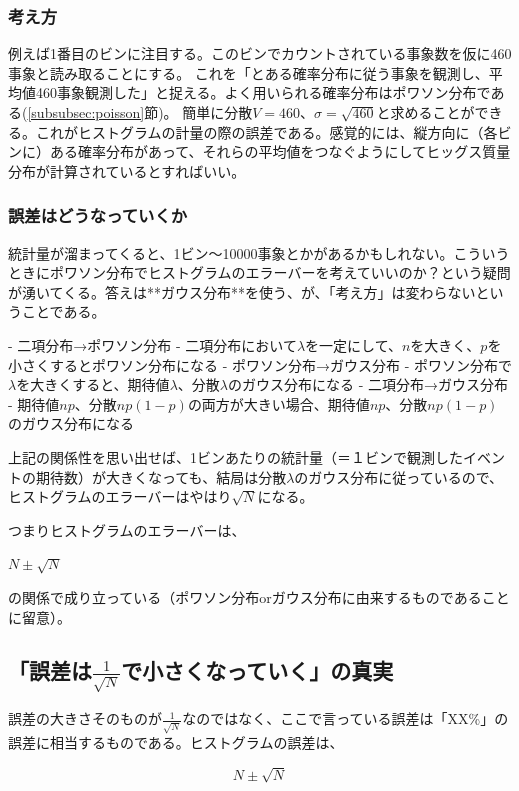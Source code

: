 \documentclass[a4paper,uplatex]{jsreport}
\begin{document}
\subsubsection{考え方}
例えば1番目のビンに注目する。このビンでカウントされている事象数を仮に460事象と読み取ることにする。
これを「とある確率分布に従う事象を観測し、平均値460事象観測した」と捉える。よく用いられる確率分布はポワソン分布である(\ref{subsubsec:poisson}節)。
簡単に分散$V=460$、$\sigma=\sqrt{460}$と求めることができる。これがヒストグラムの計量の際の誤差である。感覚的には、縦方向に（各ビンに）ある確率分布があって、それらの平均値をつなぐようにしてヒッグス質量分布が計算されているとすればいい。

\subsubsection{誤差はどうなっていくか}
統計量が溜まってくると、1ビン〜10000事象とかがあるかもしれない。こういうときにポワソン分布でヒストグラムのエラーバーを考えていいのか？という疑問が湧いてくる。答えは**ガウス分布**を使う、が、「考え方」は変わらないということである。

- 二項分布→ポワソン分布
- 二項分布において$\lambda$を一定にして、$n$を大きく、$p$を小さくするとポワソン分布になる
- ポワソン分布→ガウス分布
- ポワソン分布で$\lambda$を大きくすると、期待値$\lambda$、分散$\lambda$のガウス分布になる
- 二項分布→ガウス分布
- 期待値$np$、分散$np(1-p)$の両方が大きい場合、期待値$np$、$分散np(1-p)$のガウス分布になる

上記の関係性を思い出せば、1ビンあたりの統計量（＝１ビンで観測したイベントの期待数）が大きくなっても、結局は分散$\lambda$のガウス分布に従っているので、ヒストグラムのエラーバーはやはり$\sqrt{N}$になる。

つまりヒストグラムのエラーバーは、

$N\pm\sqrt{N}$

の関係で成り立っている（ポワソン分布orガウス分布に由来するものであることに留意）。


\subsection{「誤差は$\frac{1}{\sqrt{N}}$で小さくなっていく」の真実}
誤差の大きさそのものが$\frac{1}{\sqrt{N}}$なのではなく、ここで言っている誤差は「XX\%」の誤差に相当するものである。ヒストグラムの誤差は、

\begin{equation}
  N\pm\sqrt{N}
\end{equation}
\end{document}

